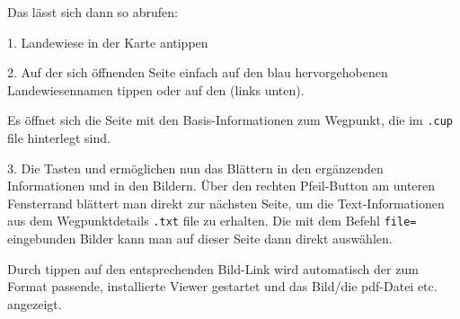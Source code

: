 Das lässt sich dann so abrufen:

1. Landewiese in der Karte antippen


2. Auf der sich öffnenden Seite einfach auf den blau hervorgehobenen Landewiesennamen tippen oder auf den  (links unten).


Es öffnet sich die Seite mit den Basis-Informationen zum Wegpunkt, die im \verb|.cup| file hinterlegt sind.


3. Die Tasten \button{$<$} und \button{$>$} ermöglichen nun das Blättern in den ergänzenden Informationen und in den Bildern. Über den rechten Pfeil-Button \button{$>$} am unteren Fensterrand blättert man direkt zur nächsten Seite, um die Text-Informationen aus dem Wegpunktdetails \verb|.txt| file zu erhalten.  
Die mit dem Befehl \verb|file=| eingebunden Bilder kann man auf dieser Seite dann direkt auswählen. 


Durch tippen auf den entsprechenden Bild-Link wird automatisch der zum Format passende, installierte Viewer gestartet und das Bild/die pdf-Datei etc. angezeigt.

